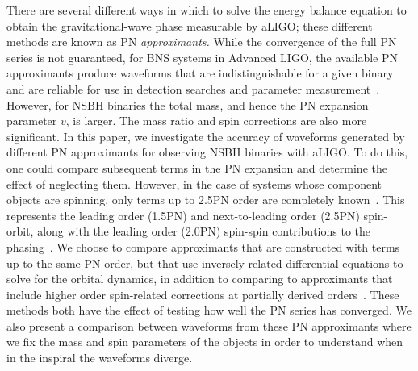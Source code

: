 There are several different ways in which to solve the energy balance equation
to obtain the gravitational-wave phase measurable by aLIGO; these different methods are known as
\ac{PN} \emph{approximants.} While the convergence of the full \ac{PN} series 
is not guaranteed, for \ac{BNS} systems in Advanced LIGO, the
available \ac{PN} approximants produce waveforms that are indistinguishable for
a given binary and are reliable for use in detection searches and parameter
measurement~\cite{Simone:1996db,Buonanno:2009zt,Brown:2012qf}. However, for \ac{NSBH}
binaries the total mass, and hence the \ac{PN} expansion parameter $v$, is
larger. The mass ratio and spin corrections are also more significant.
In this paper, we investigate the accuracy of 
waveforms generated by different \ac{PN} approximants for observing \ac{NSBH}
binaries with aLIGO.
To do this, one could compare subsequent terms in the \ac{PN} expansion and
determine the effect of neglecting them. However, in the case of systems whose
component objects are spinning, only terms up to 2.5\ac{PN} order are
completely known~\cite{Kidder:1992fr,Kidder:1995zr,Arun:2008kb}. 
This represents the leading order (1.5\ac{PN}) and
next-to-leading order (2.5\ac{PN}) spin-orbit, along with the leading order
(2.0\ac{PN}) spin-spin contributions to the phasing~\cite{Kidder:1992fr,Kidder:1995zr,Arun:2008kb}.  
We choose to compare approximants that are constructed with terms up to the same
\ac{PN} order, but that use inversely related differential equations to solve
for the orbital dynamics, in addition to comparing to approximants that include
higher order spin-related corrections at partially derived orders~\cite{Bohe:2013cla, Blanchet:2011zv}.
These methods both have the effect of testing
how well the \ac{PN} series has converged. We also present a comparison between
waveforms from these \ac{PN} approximants where we fix the mass and spin
parameters of the objects in order to understand when in the inspiral the waveforms diverge.


